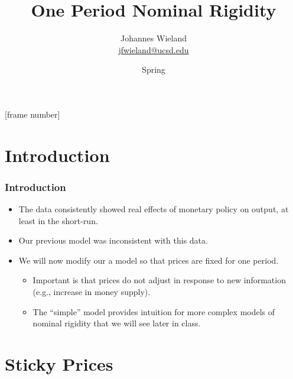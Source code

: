 \documentclass[english,xcolor=svgnames]{beamer}
\begin{document}
\title{One Period Nominal Rigidity}
\vspace{1cm}
\author[shortname]{
\begin{tabular}{c}
	Johannes Wieland \\ 
	\footnotesize \href{mailto:jfwieland@ucsd.edu}{jfwieland@ucsd.edu}  \\ 
\end{tabular}
}

\date{Spring \the\year}

\makebeamertitle
{}[frame number]{}

\addtocounter{framenumber}{-1}

\section{Introduction}

\begin{frame}
\frametitle{Introduction
}
\begin{itemize}
	\item The data consistently showed real effects of monetary policy on output, at least in the short-run.
	\item Our previous model was inconsistent with this data.
	\item We will now modify our a model so that prices are fixed for one period.
	\begin{itemize}
		\item Important is that prices do not adjust in response to new information (e.g., increase in money supply).
		\item The ``simple'' model provides intuition for more complex models of nominal rigidity that we will see later in class.
	\end{itemize}
\end{itemize}
\end{frame}

\section{Sticky Prices}
\end{document}
